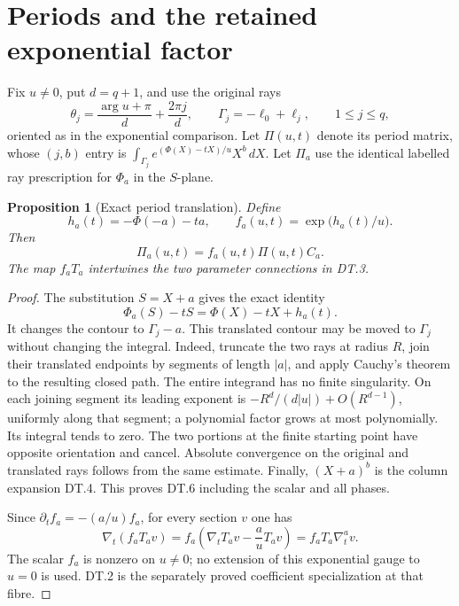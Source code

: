 \documentclass[11pt,a4paper]{article}
\newtheorem{proposition}{Proposition}
\begin{document}
\section{Periods and the retained exponential factor}
Fix \(u\ne0\), put \(d=q+1\), and use the original rays
\[
 \theta_j=\frac{\arg u+\pi}{d}+\frac{2\pi j}{d},\qquad
 \Gamma_j=-\ell_0+\ell_j,\qquad 1\le j\le q,
\]
oriented as in the exponential comparison. Let \(\Pi(u,t)\) denote its
period matrix, whose \((j,b)\) entry is
\(\int_{\Gamma_j}e^{(\Phi(X)-tX)/u}X^b\,dX\).
Let \(\Pi_a\) use the identical labelled ray prescription for \(\Phi_a\)
in the \(S\)-plane.

\begin{proposition}[Exact period translation]
Define
\begin{equation}\tag{DT.5}
 h_a(t)=-\Phi(-a)-ta,\qquad f_a(u,t)=\exp\bigl(h_a(t)/u\bigr).
\end{equation}
Then
\begin{equation}\tag{DT.6}
 \Pi_a(u,t)=f_a(u,t)\Pi(u,t)C_a.
\end{equation}
The map \(f_aT_a\) intertwines the two parameter connections in DT.3.
\end{proposition}
\begin{proof}
The substitution \(S=X+a\) gives the exact identity
\[
 \Phi_a(S)-tS=\Phi(X)-tX+h_a(t).
\]
It changes the contour to \(\Gamma_j-a\). This translated contour
may be moved to \(\Gamma_j\) without changing the integral. Indeed,
truncate the two rays at radius \(R\), join their translated endpoints
by segments of length \(|a|\), and apply Cauchy's theorem to the
resulting closed path. The entire integrand has no finite singularity.
On each joining segment its leading exponent is
\(-R^d/(d|u|)+O(R^{d-1})\), uniformly along that segment; a polynomial
factor grows at most polynomially. Its integral tends to zero.
The two portions at the finite starting point have opposite orientation
and cancel. Absolute convergence on the original and translated rays
follows from the same estimate. Finally, \((X+a)^b\) is the column
expansion DT.4. This proves DT.6 including the scalar and all phases.

Since \(\partial_tf_a=-(a/u)f_a\), for every section \(v\) one has
\[
 \nabla_t(f_aT_av)
  =f_a\left(\nabla_tT_av-\frac a uT_av\right)
  =f_aT_a\nabla_t^av.
\]
The scalar \(f_a\) is nonzero on \(u\ne0\); no extension of this
exponential gauge to \(u=0\) is used. DT.2 is the separately proved
coefficient specialization at that fibre.
\end{proof}
\end{document}
